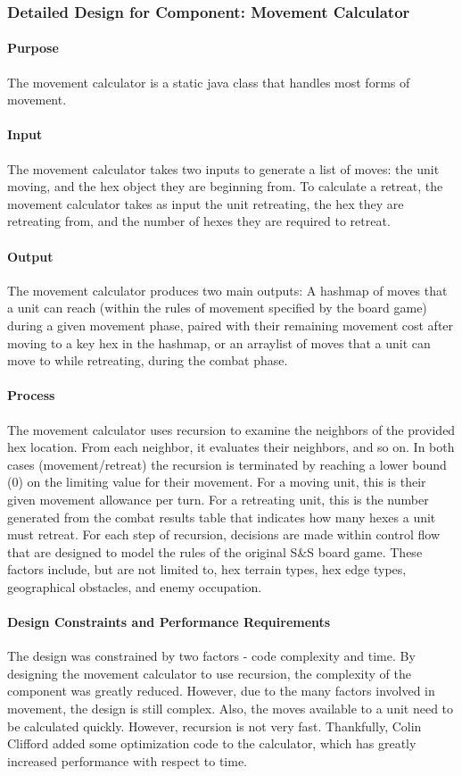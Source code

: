 \documentclass[12pt,a4paper]{article}
\begin{document}
\subsubsection{Detailed Design for Component: Movement Calculator}
\paragraph{Purpose} The movement calculator is a static java class that handles most forms of movement. 
\paragraph{Input} The movement calculator takes two inputs to generate a list of moves: the unit moving, and the hex object they are beginning from. To calculate a retreat, the movement calculator takes as input the unit retreating, the hex they are retreating from, and the number of hexes they are required to retreat.
\paragraph{Output} The movement calculator produces two main outputs: A hashmap of moves that a unit can reach (within the rules of movement specified by the board game) during a given movement phase, paired with their remaining movement cost after moving to a key hex in the hashmap, or an arraylist of moves that a unit can move to while retreating, during the combat phase.
\paragraph{Process} The movement calculator uses recursion to examine the neighbors of the provided hex location. From each neighbor, it evaluates their neighbors, and so on. In both cases (movement/retreat) the recursion is terminated by reaching a lower bound (0) on the limiting value for their movement. For a moving unit, this is their given movement allowance per turn. For a retreating unit, this is the number generated from the combat results table that indicates how many hexes a unit must retreat. For each step of recursion, decisions are made within control flow that are designed to model the rules of the original S\&S board game. These factors include, but are not limited to, hex terrain types, hex edge types, geographical obstacles, and enemy occupation. 
\paragraph{Design Constraints and Performance Requirements} The design was constrained by two factors - code complexity and time. By designing the movement calculator to use recursion, the complexity of the component was greatly reduced. However, due to the many factors involved in movement, the design is still complex. Also, the moves available to a unit need to be calculated quickly. However, recursion is not very fast. Thankfully, Colin Clifford added some optimization code to the calculator, which has greatly increased performance with respect to time.
\end{document}
